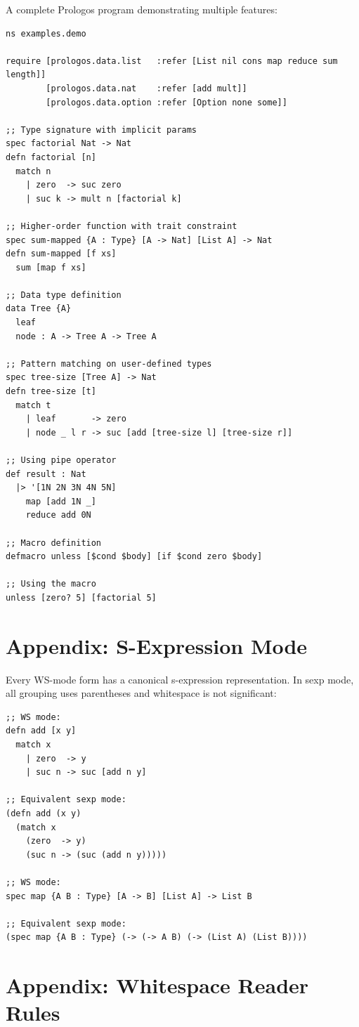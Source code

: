 \documentclass[11pt]{article}
\begin{document}
A complete Prologos program demonstrating multiple features:

\begin{verbatim}
ns examples.demo

require [prologos.data.list   :refer [List nil cons map reduce sum length]]
        [prologos.data.nat    :refer [add mult]]
        [prologos.data.option :refer [Option none some]]

;; Type signature with implicit params
spec factorial Nat -> Nat
defn factorial [n]
  match n
    | zero  -> suc zero
    | suc k -> mult n [factorial k]

;; Higher-order function with trait constraint
spec sum-mapped {A : Type} [A -> Nat] [List A] -> Nat
defn sum-mapped [f xs]
  sum [map f xs]

;; Data type definition
data Tree {A}
  leaf
  node : A -> Tree A -> Tree A

;; Pattern matching on user-defined types
spec tree-size [Tree A] -> Nat
defn tree-size [t]
  match t
    | leaf       -> zero
    | node _ l r -> suc [add [tree-size l] [tree-size r]]

;; Using pipe operator
def result : Nat
  |> '[1N 2N 3N 4N 5N]
    map [add 1N _]
    reduce add 0N

;; Macro definition
defmacro unless [$cond $body] [if $cond zero $body]

;; Using the macro
unless [zero? 5] [factorial 5]
\end{verbatim}
\section{Appendix: S-Expression Mode}
\label{sec:org80043a0}

Every WS-mode form has a canonical s-expression representation. In sexp mode,
all grouping uses parentheses and whitespace is not significant:

\begin{verbatim}
;; WS mode:
defn add [x y]
  match x
    | zero  -> y
    | suc n -> suc [add n y]

;; Equivalent sexp mode:
(defn add (x y)
  (match x
    (zero  -> y)
    (suc n -> (suc (add n y)))))

;; WS mode:
spec map {A B : Type} [A -> B] [List A] -> List B

;; Equivalent sexp mode:
(spec map {A B : Type} (-> (-> A B) (-> (List A) (List B))))
\end{verbatim}
\section{Appendix: Whitespace Reader Rules}
\label{sec:orgb8dc05a}
\end{document}
